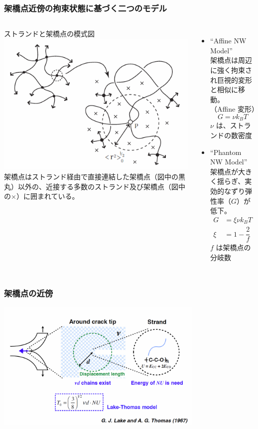 \documentclass[11pt, dvipdfmx]{beamer}
\begin{document}
\begin{frame}
\frametitle{架橋点近傍の拘束状態に基づく二つのモデル}
\begin{columns}[totalwidth=1\textwidth]
ストランドと架橋点の模式図
\includegraphics[width=\textwidth]{./fig/JP_vicinity.png}
架橋点はストランド経由で直接連結した架橋点（図中の黒丸）以外の、近接する多数のストランド及び架橋点（図中の×）に囲まれている。
\begin{itemize}
\item
``Affine NW Model''\\
架橋点は周辺に強く拘束され巨視的変形と相似に移動。\\（Affine 変形）
\footnotesize
\begin{equation*}
G=\nu k_B T
\end{equation*}
\normalsize
$\nu$ は、ストランドの数密度
\item
``Phantom NW Model''\\
架橋点が大きく揺らぎ、実効的なずり弾性率（$G$）が低下。
\footnotesize
\begin{align*}
G&=\xi \nu k_B T \\
\xi&= 1 -\dfrac{2}{f}
\end{align*}
\normalsize
$f$ は架橋点の分岐数
\end{itemize}
\end{columns}
\end{frame}
\begin{frame}
\frametitle{架橋点の近傍}
\centering
\includegraphics[width=100mm]{./fig/Lake_Thomas.png}
\end{frame}
\end{document}
